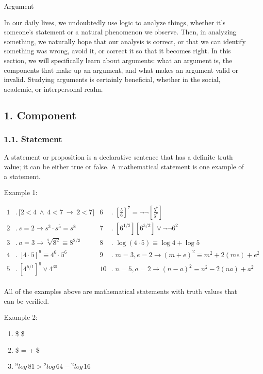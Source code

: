Argument

In our daily lives, we undoubtedly use logic to analyze things, whether
it's someone's statement or a natural phenomenon we observe. Then, in
analyzing something, we naturally hope that our analysis is correct, or
that we can identify something was wrong, avoid it, or correct it so
that it becomes right. In this section, we will specifically learn about
arguments: what an argument is, the components that make up an argument,
and what makes an argument valid or invalid. Studying arguments is
certainly beneficial, whether in the social, academic, or interpersonal
realm.

\subsection{1. Component}\label{component}

\subsubsection{1.1. Statement}\label{statement}

A statement or proposition is a declarative sentence that has a definite
truth value; it can be either true or false. A mathematical statement is
one example of a statement.

Example 1:

\[
\begin{align*}
1 &.\ \displaystyle\bigl[2<4 \ \wedge \ 4<7 \ \to \ 2<7 \bigr]
& 6 &.\ \left[\frac{5}{6}\right]^7 = \neg \neg \left[\frac{5^7}{6^7}\right] \\[2mm]
2 &.\ s =2 \to s^3 \cdot s^5 = s^8
& 7 &.\ \left[6^{1/2}\right]\left[6^{3/2}\right] \lor \neg \neg 6^2 \\[2mm]
3 &.\ a = 3 \to \sqrt[a]{8^2} \equiv 8^{2/3}
& 8 &.\ \log(4 \cdot 5) \equiv \log 4 + \log 5 \\[2mm]
4 &.\ \left[4 \cdot 5\right]^6 \equiv 4^6 \cdot 5^6
& 9 &.\ m = 3, e = 2 \to (m+e)^2 \equiv m^2 + 2(me) + e^2 \\[2mm]
5 &.\ \left[4^{5/1}\right]^6 \lor 4^{30}
& 10 &.\ n = 5, a = 2 \to (n-a)^2 \equiv n^2 - 2(na) + a^2 \\[4mm]
\end{align*}
\]

All of the examples above are mathematical statements with truth values
that can be verified.

Example 2:

\begin{enumerate}
\def\labelenumi{\arabic{enumi}.}
\tightlist
\item
  \$ \$\\
\item
  \$ =  +  \$
\item
  \({}^{9}\!log\,81 > {}^{2}\!log\,64 - {}^{2}\!log\,16\)
\end{enumerate}


